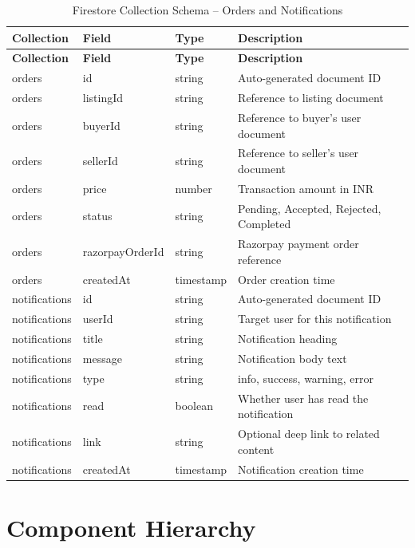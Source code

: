\documentclass[a4paper,12pt,oneside]{report}
\begin{document}
\begin{longtable}{|p{2.5cm}|p{3cm}|p{2cm}|p{5cm}|}
\caption{Firestore Collection Schema -- Orders and Notifications} \label{tab:schema-orders} \\
\hline
\textbf{Collection} & \textbf{Field} & \textbf{Type} & \textbf{Description} \\
\hline
\endfirsthead
\hline
\textbf{Collection} & \textbf{Field} & \textbf{Type} & \textbf{Description} \\
\hline
\endhead
orders & id & string & Auto-generated document ID \\
\hline
orders & listingId & string & Reference to listing document \\
\hline
orders & buyerId & string & Reference to buyer's user document \\
\hline
orders & sellerId & string & Reference to seller's user document \\
\hline
orders & price & number & Transaction amount in INR \\
\hline
orders & status & string & Pending, Accepted, Rejected, Completed \\
\hline
orders & razorpayOrderId & string & Razorpay payment order reference \\
\hline
orders & createdAt & timestamp & Order creation time \\
\hline
\hline
notifications & id & string & Auto-generated document ID \\
\hline
notifications & userId & string & Target user for this notification \\
\hline
notifications & title & string & Notification heading \\
\hline
notifications & message & string & Notification body text \\
\hline
notifications & type & string & info, success, warning, error \\
\hline
notifications & read & boolean & Whether user has read the notification \\
\hline
notifications & link & string & Optional deep link to related content \\
\hline
notifications & createdAt & timestamp & Notification creation time \\
\hline
\end{longtable}

\section{Component Hierarchy}
\end{document}
